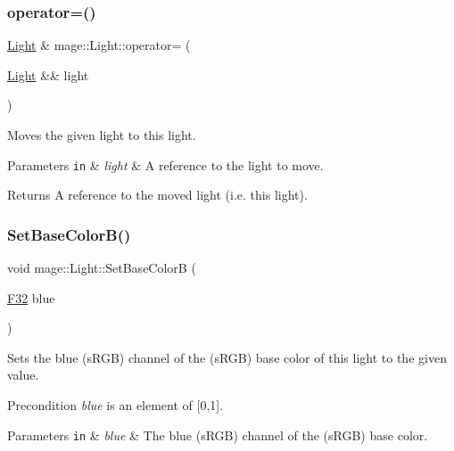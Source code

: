 \subsubsection{\texorpdfstring{operator=()}{operator=()}\hspace{0.1cm}{\footnotesize\ttfamily [2/2]}}
{\footnotesize\ttfamily \hyperlink{classmage_1_1_light}{Light} \& mage\+::\+Light\+::operator= (\begin{DoxyParamCaption}\item[{\hyperlink{classmage_1_1_light}{Light} \&\&}]{light }\end{DoxyParamCaption})\hspace{0.3cm}{\ttfamily [default]}}

Moves the given light to this light.


\begin{DoxyParams}[1]{Parameters}
\mbox{\tt in}  & {\em light} & A reference to the light to move. \\
\hline
\end{DoxyParams}
\begin{DoxyReturn}{Returns}
A reference to the moved light (i.\+e. this light). 
\end{DoxyReturn}
\hypertarget{classmage_1_1_light_a607091a28e43276ffb9d099f7519a955}{}\label{classmage_1_1_light_a607091a28e43276ffb9d099f7519a955} 
\subsubsection{\texorpdfstring{Set\+Base\+Color\+B()}{SetBaseColorB()}}
{\footnotesize\ttfamily void mage\+::\+Light\+::\+Set\+Base\+ColorB (\begin{DoxyParamCaption}\item[{\hyperlink{namespacemage_aa97e833b45f06d60a0a9c4fc22ae02c0}{F32}}]{blue }\end{DoxyParamCaption})\hspace{0.3cm}{\ttfamily [noexcept]}}

Sets the blue (s\+R\+GB) channel of the (s\+R\+GB) base color of this light to the given value.

\begin{DoxyPrecond}{Precondition}
{\itshape blue} is an element of \mbox{[}0,1\mbox{]}. 
\end{DoxyPrecond}

\begin{DoxyParams}[1]{Parameters}
\mbox{\tt in}  & {\em blue} & The blue (s\+R\+GB) channel of the (s\+R\+GB) base color. \\
\hline
\end{DoxyParams}
\hypertarget{classmage_1_1_light_aea8e8f31ff6b193c0af2a0cdd0f215d8}{}\label{classmage_1_1_light_aea8e8f31ff6b193c0af2a0cdd0f215d8} 
